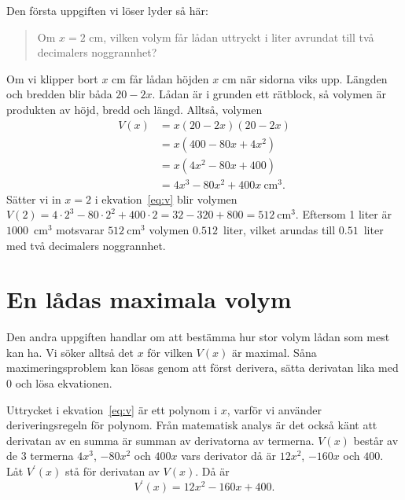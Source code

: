 \documentclass[a4paper,12pt]{article}
\begin{document}
Den första uppgiften vi löser lyder så här:
%
\begin{quote}
  Om $x = 2$ cm, vilken volym får lådan uttryckt i liter avrundat till
  två decimalers noggrannhet?  
\end{quote}
%
Om vi klipper bort $x$ cm får lådan höjden $x$ cm när sidorna viks
upp. Längden och bredden blir båda $20 - 2x$. Lådan är i grunden ett
rätblock, så volymen är produkten av höjd, bredd och längd. Alltså,
volymen 
%
\begin{align}
  V(x) &= x (20 - 2x) (20 - 2x)   \nonumber \\
       &= x (400   - 80x   + 4x^2) \nonumber \\
       &= x (4x^2  - 80x   + 400)  \nonumber \\
       &=    4x^3  - 80x^2 + 400x ~\text{cm}^3.  \label{eq:v}
\end{align}
%
Sätter vi in $x = 2$ i ekvation~\ref{eq:v} blir volymen
%
  $V(2) = 4 \cdot 2^3 - 80 \cdot 2^2 + 400 \cdot 2
        = 32          - 320          + 800
        = 512~\text{cm}^3.$
%
Eftersom 1 liter är $1000$~cm$^3$ motsvarar $512~\text{cm}^3$ volymen
$0.512$~liter, vilket arundas till $0.51$~liter med två decimalers
noggrannhet. 


\section{En lådas maximala volym}


Den andra uppgiften handlar om att bestämma hur stor volym lådan som
mest kan ha. Vi söker alltså det $x$ för vilken $V(x)$ är
maximal. Såna maximeringsproblem kan lösas genom att först derivera, 
sätta derivatan lika med $0$ och lösa ekvationen. 


Uttrycket i ekvation~\ref{eq:v} är ett polynom i $x$, varför vi
använder deriveringsregeln för polynom. Från matematisk analys är det
också känt att derivatan av en summa är summan av derivatorna av
termerna. $V(x)$ består av de 3 termerna $4x^3$,  $-80x^2$ och $400x$
vars derivator då är $12x^2$,  $-160x$ och $400$. Låt $V^\prime(x)$ stå
för derivatan av $V(x)$. Då är
%
\begin{equation}
  \label{eq:vprime}
  V^\prime(x) = 12x^2 - 160x + 400. 
\end{equation}
\end{document}
